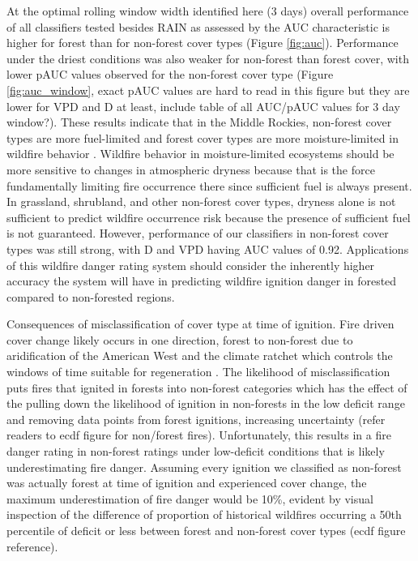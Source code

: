 \documentclass[11p]{article}
\begin{document}
At the optimal rolling window width identified here (3 days) overall performance of all classifiers tested besides RAIN as assessed by the AUC characteristic is higher for forest than for non-forest cover types (Figure \ref{fig:auc}). Performance under the driest conditions was also weaker for non-forest than forest cover, with lower pAUC values observed for the non-forest cover type (Figure \ref{fig:auc_window}, exact pAUC values are hard to read in this figure but they are lower for VPD and D at least, include table of all AUC/pAUC values for 3 day window?). These results indicate that in the Middle Rockies, non-forest cover types are more fuel-limited and forest cover types are more moisture-limited in wildfire behavior \citep{meynEnvironmentalDriversLarge2007}. Wildfire behavior in moisture-limited ecosystems should be more sensitive to changes in atmospheric dryness because that is the force fundamentally limiting fire occurrence there since sufficient fuel is always present. In grassland, shrubland, and other non-forest cover types, dryness alone is not sufficient to predict wildfire occurrence risk because the presence of sufficient fuel is not guaranteed. However, performance of our classifiers in non-forest cover types was still strong, with D and VPD having AUC values of 0.92. Applications of this wildfire danger rating system should consider the inherently higher accuracy the system will have in predicting wildfire ignition danger in forested compared to non-forested regions.  

Consequences of misclassification of cover type at time of ignition. Fire driven cover change likely occurs in one direction, forest to non-forest due to aridification of the American West and the climate ratchet which controls the windows of time suitable for regeneration \citep{jacksonEcologyRatchetEvents2009}. The likelihood of misclassification puts fires that ignited in forests into non-forest categories which has the effect of the pulling down the likelihood of ignition in non-forests in the low deficit range and removing data points from forest ignitions, increasing uncertainty (refer readers to ecdf figure for non/forest fires). Unfortunately, this results in a fire danger rating in non-forest ratings under low-deficit conditions that is likely underestimating fire danger. Assuming every ignition we classified as non-forest was actually forest at time of ignition and experienced cover change, the maximum underestimation of fire danger would be 10\%, evident by visual inspection of the difference of proportion of historical wildfires occurring a 50th percentile of deficit or less between forest and non-forest cover types (ecdf figure reference). 
\end{document}
